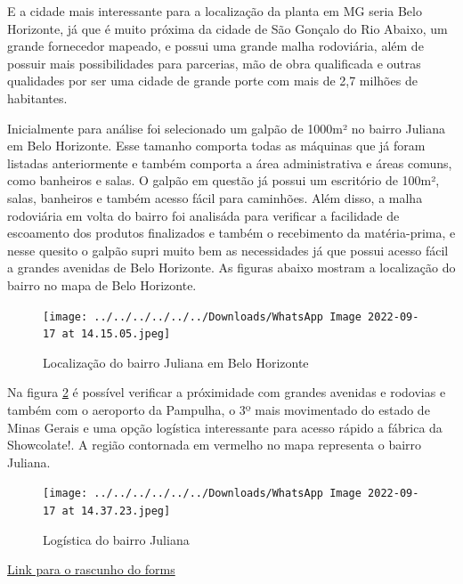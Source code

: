 \documentclass[
	12pt,				%
	openright,			%
	oneside,			%
	a4paper,			%
	english,			%
	french,				%
	spanish,			%
	brazil				%
	]{abntex2}
\begin{document}
E a cidade mais interessante para a localização da planta em MG seria Belo Horizonte, já que é muito próxima da cidade de São Gonçalo do Rio Abaixo, um grande fornecedor mapeado, e possui uma grande malha rodoviária, além de possuir mais possibilidades para parcerias, mão de obra qualificada e outras qualidades por ser uma cidade  de grande porte com mais de 2,7 milhões de habitantes. 

Inicialmente para análise foi selecionado um galpão de 1000m² no bairro Juliana em Belo Horizonte. Esse tamanho comporta todas as máquinas que já foram listadas anteriormente e também comporta a área administrativa e áreas comuns, como banheiros e salas. O galpão em questão já possui um escritório de 100m², salas, banheiros e também acesso fácil para caminhões. Além disso, a malha rodoviária em volta do bairro foi analisáda para verificar a facilidade de escoamento dos produtos finalizados e também o recebimento da matéria-prima, e nesse quesito o galpão supri muito bem as necessidades já que possui acesso fácil a grandes avenidas de Belo Horizonte. As figuras abaixo mostram a localização do bairro no mapa de Belo Horizonte.


\begin{figure}[H]
\begin{center}
\caption{Localização do bairro Juliana em Belo Horizonte}
\texttt{[image: ../../../../../../Downloads/WhatsApp Image 2022-09-17 at 14.15.05.jpeg]} 
\label{loca1}
\end{center}
\end{figure}

Na figura \ref{loca2} é possível verificar a próximidade com grandes avenidas e rodovias e também com o aeroporto da Pampulha, o 3º mais movimentado do estado de Minas Gerais e uma opção logística interessante para acesso rápido a fábrica da Showcolate!. A região contornada em vermelho no mapa representa o bairro Juliana.


\begin{figure}[H]
\begin{center}
\caption{Logística do bairro Juliana}
\texttt{[image: ../../../../../../Downloads/WhatsApp Image 2022-09-17 at 14.37.23.jpeg]} 
\label{loca2}
\end{center}
\end{figure}



\begin{center}
\href{https://forms.gle/YC3XWbkiy5DYUYbk7}{Link para o rascunho do forms}
\end{center}
\end{document}
